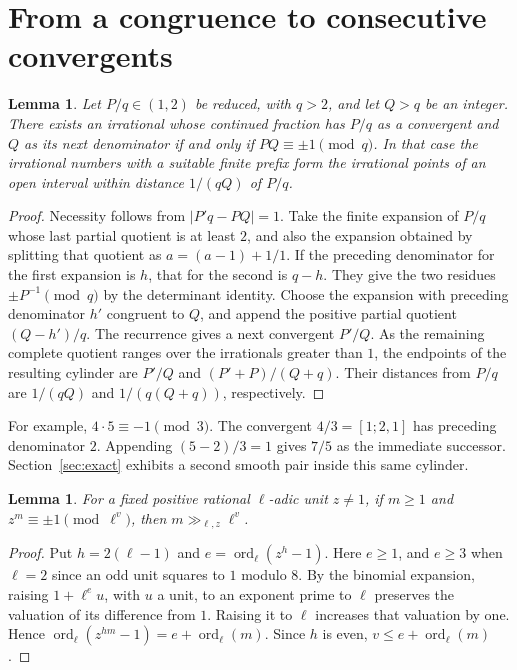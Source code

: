 \documentclass[11pt]{article}
\newtheorem{lemma}[theorem]{Lemma}
\begin{document}
\section{From a congruence to consecutive convergents}
\begin{lemma}\label{lem:cyl}
Let $P/q\in(1,2)$ be reduced, with $q>2$, and let $Q>q$ be an integer.
There exists an irrational whose continued fraction has $P/q$ as a
convergent and $Q$ as its next denominator if and only if
$P Q\equiv\pm1\pmod q$. In that case the
irrational numbers with a suitable finite prefix form the irrational
points of an open interval within distance $1/(qQ)$ of $P/q$.
\end{lemma}
\begin{proof}
Necessity follows from $|P' q-P Q|=1$. Take the finite expansion of
$P/q$ whose last partial quotient is at least $2$, and also the expansion
obtained by splitting that quotient as $a=(a-1)+1/1$. If the preceding
denominator for the first expansion is $h$, that for the second is $q-h$.
They give the two residues $\pm P^{-1}\pmod q$ by the determinant
identity. Choose the expansion with preceding denominator $h'$ congruent
to $Q$, and append the positive partial quotient $(Q-h')/q$.
The recurrence gives a next convergent $P'/Q$. As the remaining complete
quotient ranges over the irrationals greater than $1$, the endpoints of
the resulting cylinder are $P'/Q$ and $(P'+P)/(Q+q)$. Their distances
from $P/q$ are $1/(qQ)$ and $1/(q(Q+q))$, respectively.
\end{proof}

For example, $4\cdot5\equiv-1\pmod3$. The convergent $4/3=[1;2,1]$
has preceding denominator $2$. Appending $(5-2)/3=1$ gives $7/5$ as
the immediate successor. Section~\ref{sec:exact} exhibits a second
smooth pair inside this same cylinder.

\begin{lemma}\label{lem:unit}
For a fixed positive rational $\ell$-adic unit $z\ne1$, if $m\ge1$ and
$z^m\equiv\pm1\pmod{\ell^v}$, then $m\gg_{\ell,z}\ell^v$.
\end{lemma}
\begin{proof}
Put $h=2(\ell-1)$ and $e=\operatorname{ord}_\ell(z^h-1)$. Here $e\ge1$,
and $e\ge3$ when $\ell=2$ since an odd unit squares to $1$ modulo $8$.
By the binomial expansion, raising $1+\ell^e u$, with $u$ a unit, to an
exponent prime to $\ell$ preserves the valuation of its difference from $1$.
Raising it to $\ell$ increases that valuation by one. Hence
$\operatorname{ord}_\ell(z^{hm}-1)=e+\operatorname{ord}_\ell(m)$.
Since $h$ is even, $v\le e+\operatorname{ord}_\ell(m)$.
\end{proof}
\end{document}
